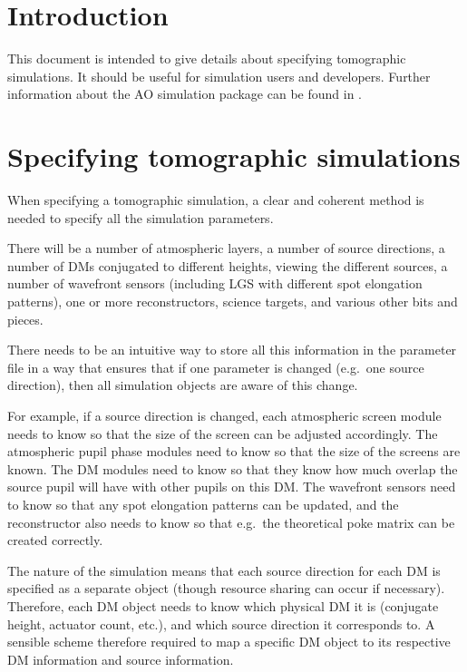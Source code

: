 \documentclass{article}
\begin{document}

\renewcommand{\dasptitle}{Preparing tomographic simulations}
\renewcommand{\daspdocno}{AOSIM-TOM-UoD-001}

\section{Introduction}
This document is intended to give details about specifying tomographic
simulations.  It should be useful for simulation users and developers.
Further information about the AO simulation package can be found in
\citet{overview}.

\section{Specifying tomographic simulations}
When specifying a tomographic simulation, a clear and coherent method
is needed to specify all the simulation parameters.

There will be a number of atmospheric layers, a number of source
directions, a number of DMs conjugated to different heights, viewing
the different sources, a number of wavefront sensors (including LGS
with different spot elongation patterns), one or more reconstructors,
science targets, and various other bits and pieces.

There needs to be an intuitive way to store all this information in
the parameter file in a way that ensures that if one parameter is
changed (e.g.\ one source direction), then all simulation objects are
aware of this change.

For example, if a source direction is changed, each atmospheric screen
module needs to know so that the size of the screen can be adjusted
accordingly.  The atmospheric pupil phase modules need to know so that
the size of the screens are known.  The DM modules need to know so
that they know how much overlap the source pupil will have with other
pupils on this DM.  The wavefront sensors need to know so that any
spot elongation patterns can be updated, and the reconstructor also
needs to know so that e.g.\ the theoretical poke matrix can be created
correctly.  

The nature of the simulation means that each source direction for each
DM is specified as a separate object (though resource sharing can
occur if necessary).  Therefore, each DM object needs to know which
physical DM it is (conjugate height, actuator count, etc.), and which
source direction it corresponds to.  A sensible scheme therefore
required to map a specific DM object to its respective DM information
and source information.  
\end{document}
